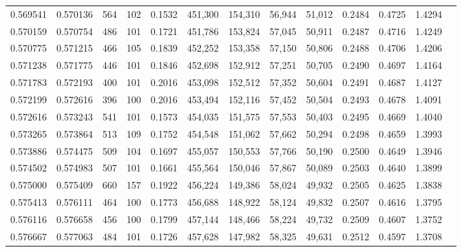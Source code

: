 \begin{tabular}{rrrrrrrrrrrrr}
0.569541 & 0.570136 &    564 &   102 &                                     0.1532 & 451,300 & 154,310 &  56,944 &  51,012 & 0.2484 & 0.4725 & 1.4294 \\
0.570159 & 0.570754 &    486 &   101 &                                     0.1721 & 451,786 & 153,824 &  57,045 &  50,911 & 0.2487 & 0.4716 & 1.4249 \\
0.570775 & 0.571215 &    466 &   105 &                                     0.1839 & 452,252 & 153,358 &  57,150 &  50,806 & 0.2488 & 0.4706 & 1.4206 \\
0.571238 & 0.571775 &    446 &   101 &                                     0.1846 & 452,698 & 152,912 &  57,251 &  50,705 & 0.2490 & 0.4697 & 1.4164 \\
0.571783 & 0.572193 &    400 &   101 &                                     0.2016 & 453,098 & 152,512 &  57,352 &  50,604 & 0.2491 & 0.4687 & 1.4127 \\
0.572199 & 0.572616 &    396 &   100 &                                     0.2016 & 453,494 & 152,116 &  57,452 &  50,504 & 0.2493 & 0.4678 & 1.4091 \\
0.572616 & 0.573243 &    541 &   101 &                                     0.1573 & 454,035 & 151,575 &  57,553 &  50,403 & 0.2495 & 0.4669 & 1.4040 \\
0.573265 & 0.573864 &    513 &   109 &                                     0.1752 & 454,548 & 151,062 &  57,662 &  50,294 & 0.2498 & 0.4659 & 1.3993 \\
0.573886 & 0.574475 &    509 &   104 &                                     0.1697 & 455,057 & 150,553 &  57,766 &  50,190 & 0.2500 & 0.4649 & 1.3946 \\
0.574502 & 0.574983 &    507 &   101 &                                     0.1661 & 455,564 & 150,046 &  57,867 &  50,089 & 0.2503 & 0.4640 & 1.3899 \\
0.575000 & 0.575409 &    660 &   157 &                                     0.1922 & 456,224 & 149,386 &  58,024 &  49,932 & 0.2505 & 0.4625 & 1.3838 \\
0.575413 & 0.576111 &    464 &   100 &                                     0.1773 & 456,688 & 148,922 &  58,124 &  49,832 & 0.2507 & 0.4616 & 1.3795 \\
0.576116 & 0.576658 &    456 &   100 &                                     0.1799 & 457,144 & 148,466 &  58,224 &  49,732 & 0.2509 & 0.4607 & 1.3752 \\
0.576667 & 0.577063 &    484 &   101 &                                     0.1726 & 457,628 & 147,982 &  58,325 &  49,631 & 0.2512 & 0.4597 & 1.3708 \\

\end{tabular}
